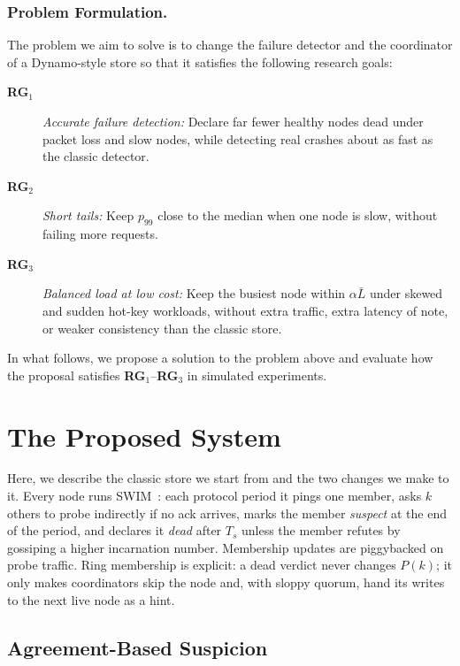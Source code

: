 \documentclass[sigconf,nonacm]{acmart}
\begin{document}
\subsubsection{Problem Formulation.} The problem we aim to solve is to change the failure detector and the coordinator of a Dynamo-style store so that it satisfies the following research goals:
\begin{description}
  \item[\textbf{RG}$_1$] \textit{Accurate failure detection:} Declare far fewer healthy nodes dead under packet loss and slow nodes, while detecting real crashes about as fast as the classic detector.
  \item[\textbf{RG}$_2$] \textit{Short tails:} Keep $p_{99}$ close to the median when one node is slow, without failing more requests.
  \item[\textbf{RG}$_3$] \textit{Balanced load at low cost:} Keep the busiest node within $\alpha\bar{L}$ under skewed and sudden hot-key workloads, without extra traffic, extra latency of note, or weaker consistency than the classic store.
\end{description}

In what follows, we propose a solution to the problem above and evaluate how the proposal satisfies \textbf{RG}$_1$--\textbf{RG}$_3$ in simulated experiments.

\section{The Proposed System}

Here, we describe the classic store we start from and the two changes we make to it. Every node runs SWIM~\cite{das2002swim}: each protocol period it pings one member, asks $k$ others to probe indirectly if no ack arrives, marks the member \emph{suspect} at the end of the period, and declares it \emph{dead} after $T_s$ unless the member refutes by gossiping a higher incarnation number. Membership updates are piggybacked on probe traffic. Ring membership is explicit: a dead verdict never changes $P(k)$; it only makes coordinators skip the node and, with sloppy quorum, hand its writes to the next live node as a hint.

\subsection{Agreement-Based Suspicion}
\end{document}
